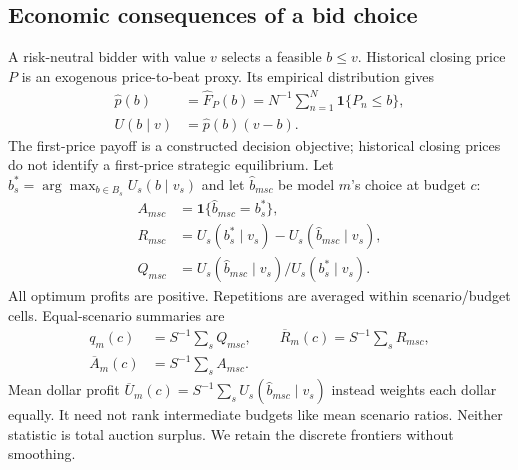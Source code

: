 \documentclass[sigconf,anonymous,nonacm]{acmart}
\begin{document}
\subsection{Economic consequences of a bid choice}
A risk-neutral bidder with value $v$ selects a feasible $b\leq v$. Historical closing price $P$ is an exogenous price-to-beat proxy. Its empirical distribution gives
\begin{equation}\begin{aligned}
\widehat p(b)&=\widehat F_P(b)=N^{-1}\sum_{n=1}^N\mathbf1\{P_n\leq b\},\\
U(b\mid v)&=\widehat p(b)(v-b).
\end{aligned}\label{eq:auctionutility}\end{equation}
The first-price payoff is a constructed decision objective; historical closing prices do not identify a first-price strategic equilibrium. Let $b_s^*=\arg\max_{b\in B_s}U_s(b\mid v_s)$ and let $\widehat b_{msc}$ be model $m$'s choice at budget $c$:
\begin{equation}\begin{aligned}
A_{msc}&=\mathbf1\{\widehat b_{msc}=b_s^*\},\\
R_{msc}&=U_s(b_s^*\mid v_s)-U_s(\widehat b_{msc}\mid v_s),\\
Q_{msc}&=U_s(\widehat b_{msc}\mid v_s)/U_s(b_s^*\mid v_s).
\end{aligned}\label{eq:metrics}\end{equation}
All optimum profits are positive. Repetitions are averaged within scenario/budget cells. Equal-scenario summaries are
\begin{equation}\begin{aligned}
q_m(c)&=S^{-1}\sum_s Q_{msc},\qquad
\overline R_m(c)=S^{-1}\sum_s R_{msc},\\
\overline A_m(c)&=S^{-1}\sum_s A_{msc}.
\end{aligned}\label{eq:frontier}\end{equation}
Mean dollar profit $\overline U_m(c)=S^{-1}\sum_s U_s(\widehat b_{msc}\mid v_s)$ instead weights each dollar equally. It need not rank intermediate budgets like mean scenario ratios. Neither statistic is total auction surplus. We retain the discrete frontiers without smoothing.
\end{document}
